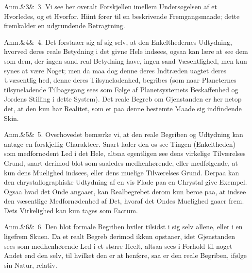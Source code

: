 \documentclass[12pt]{book}
\def\sperr#1{#1}%
\def\textit#1{#1}%
\def\emph#1{#1}%
\newcommand{\sperr}[1]{\textls[180]{#1}}
\newcommand{\anm}[1]{%
  \par\vspace{0.5\baselineskip}%
  \noindent\hspace{\parindent}\sperr{Anm.}\ifx&#1&\else~\textit{#1}.\fi
  \enspace\ignorespaces
}
\newcommand{\opage}[1]{\marginnote{\footnotesize\textit{[#1]}}}
\begin{document}
\anm{3} Vi see her overalt Forskjellen imellem Undersøgelsen af et Hvorledes,
og et Hvorfor. Hiint fører til en \emph{beskrivende Fremgangsmaade}; dette
fremkalder en \emph{udgrundende Betragtning}.

\anm{4} Det forstaaer sig af sig selv, at den Enkelthedernes Udtydning, hvorved
deres reale Betydning i det givne Hele indsees, ogsaa kan lære at see dem som
dem, der ingen sand real Betydning have, ingen sand Væsentlighed, men kun synes
at være Noget; men da maa dog denne deres Indtræden uagtet deres Uvæsentlig%
\opage{52}hed, denne deres Tilsyneladenhed, begribes (som naar Planeternes tilsyneladende
Tilbagegang sees som Følge af Planetsystemets Beskaffenhed og Jordens Stilling
i dette System). Det reale Begreb om Gjenstanden er her netop det, at den kun
har Realitet, som et paa denne bestemte Maade sig indfindende Skin.

\anm{5} Overhovedet bemærke vi, at den reale Begriben og Udtydning kan antage
en forskjellig Charakteer. Snart lader den os see Tingen (Enkeltheden) som
medfornødent Led i det Hele, altsaa egentligen see dens virkelige Tilværelses
Grund, snart derimod blot som saaledes medhenhørende, eller medfølgende, at kun
dens Muelighed indsees, eller dens muelige Tilværelses Grund. Derpaa kan den
chrystallographiske Udtydning af en vis Flade paa en Chrystal give Exempel.
Ogsaa hvad det Onde angaaer, kan Realbegrebet derom kun beroe paa, at indsee
den væsentlige Medfornødenhed af Det, hvoraf det Ondes Muelighed gaaer frem.
Dets Virkelighed kan kun tages som Factum.

\anm{6} Den blot formale Begriben hviler tilsidst i sig selv allene, eller i en
ligefrem Skuen.
Da et realt Begreb derimod ikkun opstaaer, idet Gjenstanden
sees som medhenhørende Led i et større Heelt, altsaa sees i Forhold til noget
Andet end den selv, til hvilket den er at henføre, saa er den reale Begriben,
ifølge sin Natur, \emph{relativ}.
\end{document}
